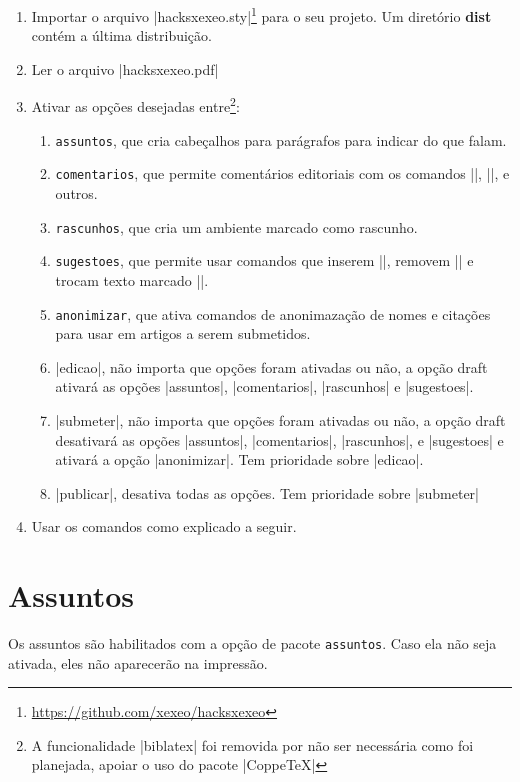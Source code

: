 \documentclass{article}
\begin{document}
    \begin{enumerate}
        \item Importar o arquivo |hacksxexeo.sty|\footnote{\url{https://github.com/xexeo/hacksxexeo}} para o seu  projeto. 
        Um diretório \textbf{dist} contém a última distribuição.
        \item Ler o arquivo |hacksxexeo.pdf|
        \item Ativar as opções desejadas entre\footnote{A funcionalidade |biblatex| foi removida por não ser necessária como foi planejada, apoiar o uso do pacote |CoppeTeX|}:
        \begin{enumerate}
            \item \verb!assuntos!, que cria cabeçalhos para parágrafos para indicar do que falam.
            \item \verb!comentarios!, que permite comentários editoriais com os comandos |\cand{}|, |\candr|, e outros.
            \item \verb!rascunhos!, que cria um ambiente marcado como rascunho.
            \item \verb!sugestoes!, que permite usar comandos que inserem |\candsug|, removem |\candrem| e trocam texto marcado |\candtroca|.
            \item \verb!anonimizar!, que ativa comandos de anonimazação de nomes e citações para usar em artigos a serem submetidos.
            \item |edicao|, não importa que opções foram ativadas ou não, a opção draft ativará as opções |assuntos|, |comentarios|, |rascunhos| e |sugestoes|.
            \item |submeter|, não importa que opções foram ativadas ou não, a opção draft desativará as opções |assuntos|, |comentarios|, |rascunhos|, e |sugestoes| e ativará a opção |anonimizar|. Tem prioridade sobre |edicao|.
            \item |publicar|, desativa todas as opções.  Tem prioridade sobre |submeter|
        \end{enumerate}
        \item Usar os comandos como explicado a seguir.
    \end{enumerate}
    
    \section{Assuntos}
    
    Os assuntos são habilitados com a opção de pacote \verb!assuntos!. Caso ela não seja ativada, eles não aparecerão na impressão.
    
\end{document}
